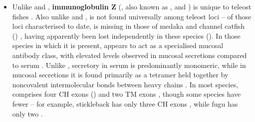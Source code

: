 \begin{itemize}

\item Unlike  and , \textbf{immunoglobulin Z} (, also known as ,  and ) is unique to teleost fishes \parencite{fillatreau2013astonishing}. Also unlike  and ,  is not found universally among teleost loci -- of those \igh{} loci characterised to date,  is missing in those of medaka and channel catfish ()  \parencite{fillatreau2013astonishing,magadan2011medaka}, having apparently been lost independently in these species (). In those species in which it is present,  appears to act as a specialised mucosal antibody class, with elevated levels observed in mucosal secretions compared to serum \parencite{zhang2010igtgut,fillatreau2013astonishing,xu2013igtskin}. Unlike , secretory  in serum is predominantly monomeric, while in mucosal secretions it is found primarily as a tetramer held together by noncovalent intermolecular bonds between heavy chains \parencite{zhang2010igtgut}. In most species,  comprises four CH exons () and two TM exons \parencite{mashoof2016immunoglobulins}, though some species have fewer -- for example, stickleback  has only three CH exons \parencite{bao2010stickleback,gambondeza2011stickleback}, while fugu  has only two \parencite{fillatreau2013astonishing,savan2005fugu}.
\end{itemize}

